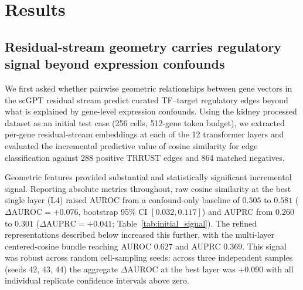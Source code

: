 \documentclass[11pt]{article}
\newcommand{\DAURC}{\Delta\mathrm{AUROC}}
\begin{document}
\section*{Results}

\subsection*{Residual-stream geometry carries regulatory signal beyond expression confounds}

We first asked whether pairwise geometric relationships between gene vectors in the scGPT residual stream predict curated TF--target regulatory edges beyond what is explained by gene-level expression confounds.
Using the kidney processed dataset as an initial test case (256 cells, 512-gene token budget), we extracted per-gene residual-stream embeddings at each of the 12 transformer layers and evaluated the incremental predictive value of cosine similarity for edge classification against 288 positive TRRUST edges and 864 matched negatives.

Geometric features provided substantial and statistically significant incremental signal.
Reporting absolute metrics throughout, raw cosine similarity at the best single layer (L4) raised AUROC from a confound-only baseline of $0.505$ to $0.581$ ($\DAURC = +0.076$, bootstrap 95\% CI $[0.032, 0.117]$) and AUPRC from $0.260$ to $0.301$ ($\Delta\mathrm{AUPRC} = +0.041$; Table~\ref{tab:initial_signal}).
The refined representations described below increased this further, with the multi-layer centered-cosine bundle reaching AUROC $0.627$ and AUPRC $0.369$.
This signal was robust across random cell-sampling seeds: across three independent samples (seeds 42, 43, 44) the aggregate $\DAURC$ at the best layer was $+0.090$ with all individual replicate confidence intervals above zero.
\end{document}
